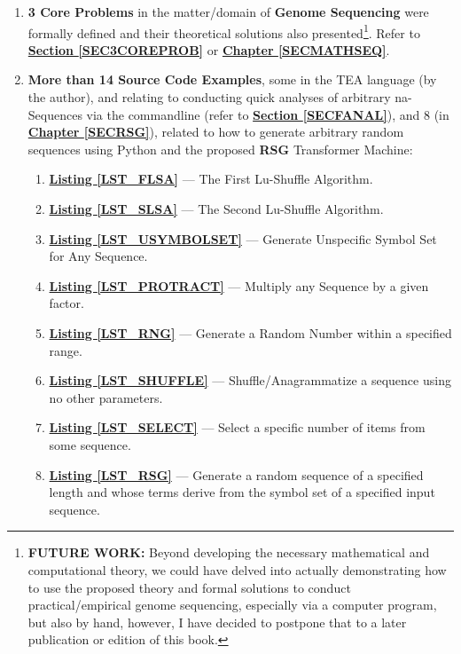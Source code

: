 \documentclass[a4paper, 18pt]{book} %
\begin{document}
\begin{enumerate}
{\begin{enumerate}
\item The \textbf{OZIN Cipher} key depicted in \textbf{\hyperref[FIGOZIN]{Figure \ref{FIGOZIN}}}
\item The \textbf{PLATO Cipher} key depicted in \textbf{\hyperref[FIGPLATONICCIPH]{Figure \ref{FIGPLATONICCIPH}}}
\end{enumerate}

}
\item \textbf{3 Core Problems} in the matter/domain of \textbf{Genome Sequencing} were formally defined and their theoretical solutions also presented\footnote{\textbf{FUTURE WORK:} Beyond developing the necessary mathematical and computational theory, we could have delved into actually demonstrating how to use the proposed theory and formal solutions to conduct practical/empirical genome sequencing, especially via a computer program, but also by hand, however, I have decided to postpone that to a later publication or edition of this book.}. Refer to  \textbf{\hyperref[SEC3COREPROB]{Section \ref{SEC3COREPROB}}} or \textbf{\hyperref[SECMATHSEQ]{Chapter \ref{SECMATHSEQ}}}.

\item{ \textbf{More than 14 Source Code Examples}, some in the TEA language (by the author\cite{cli_tttt}), and relating to conducting quick analyses of arbitrary na-Sequences via the commandline (refer to \textbf{\hyperref[SECFANAL]{Section \ref{SECFANAL}}}), and 8 (in \textbf{\hyperref[SECRSG]{Chapter \ref{SECRSG}}}), related to how to generate arbitrary random sequences using Python and the proposed \textbf{RSG} Transformer Machine:

\begin{enumerate}
\item \textbf{\hyperref[LST_FLSA]{Listing \ref{LST_FLSA}}} --- The First Lu-Shuffle Algorithm.
\item \textbf{\hyperref[LST_SLSA]{Listing \ref{LST_SLSA}}} --- The Second  Lu-Shuffle Algorithm.
\item \textbf{\hyperref[LST_USYMBOLSET]{Listing \ref{LST_USYMBOLSET}}} --- Generate Unspecific Symbol Set for Any Sequence.
\item \textbf{\hyperref[LST_PROTRACT]{Listing \ref{LST_PROTRACT}}} --- Multiply any Sequence by a given factor.
\item \textbf{\hyperref[LST_RNG]{Listing \ref{LST_RNG}}} --- Generate a Random Number within a specified range.
\item \textbf{\hyperref[LST_SHUFFLE]{Listing \ref{LST_SHUFFLE}}} --- Shuffle/Anagrammatize a sequence using no other parameters.
\item \textbf{\hyperref[LST_SELECT]{Listing \ref{LST_SELECT}}} --- Select a specific number of items from some sequence.
\item \textbf{\hyperref[LST_RSG]{Listing \ref{LST_RSG}}} --- Generate a random sequence of a specified length and whose terms derive from the symbol set of a specified input sequence.
\end{enumerate}

}
\end{enumerate}
\end{document}
